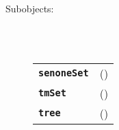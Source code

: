 \begin{description}
  \item[Subobjects:] \hfill \\
\ 
    \begin{tabular}{ll}
      \texttt{\textbf{senoneSet}} & (\Jref{module}{SenoneSet}) \\
      \texttt{\textbf{tmSet}} & (\Jref{module}{TmSet}) \\
      \texttt{\textbf{tree}} & (\Jref{module}{Tree}) \\
    \end{tabular}
\vspace{3mm}

\end{description}


